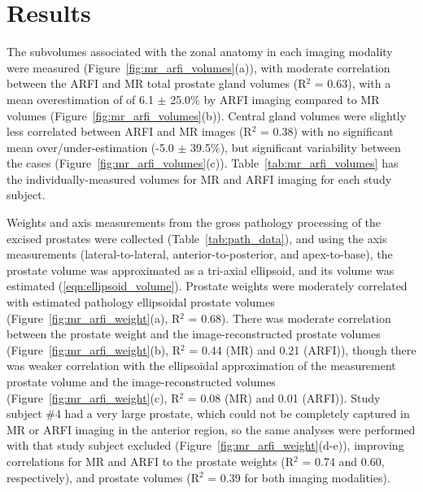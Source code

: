 \section{Results}\label{sect:results}
The subvolumes associated with the zonal anatomy in each imaging modality were
measured (Figure~\ref{fig:mr_arfi_volumes}(a)), with moderate correlation
between the ARFI and MR total prostate gland volumes (R$^2$ = 0.63), with a
mean overestimation of of 6.1 $\pm$ 25.0\% by ARFI imaging compared to MR
volumes (Figure~\ref{fig:mr_arfi_volumes}(b)).  Central gland volumes were
slightly less correlated between ARFI and MR images (R$^2$ = 0.38) with no
significant mean over/under-estimation (-5.0 $\pm$ 39.5\%), but significant
variability between the cases (Figure~\ref{fig:mr_arfi_volumes}(c)).
Table~\ref{tab:mr_arfi_volumes} has the individually-measured volumes for MR
and ARFI imaging for each study subject.



Weights and axis measurements from the gross pathology processing of the
excised prostates were collected (Table~\ref{tab:path_data}), and using the
axis measurements (lateral-to-lateral, anterior-to-posterior, and
apex-to-base), the prostate volume was approximated as a tri-axial ellipsoid,
and its volume was estimated (\ref{eqn:ellipsoid_volume}).  Prostate weights
were moderately correlated with estimated pathology ellipsoidal prostate
volumes (Figure~\ref{fig:mr_arfi_weight}(a), R$^2$ = 0.68).  There was moderate
correlation between the prostate weight and the image-reconstructed prostate
volumes (Figure~\ref{fig:mr_arfi_weight}(b), R$^2$ = 0.44 (MR) and 0.21
(ARFI)), though there was weaker correlation with the ellipsoidal approximation
of the measurement prostate volume and the image-reconstructed volumes
(Figure~\ref{fig:mr_arfi_weight}(c), R$^2$ = 0.08 (MR) and 0.01 (ARFI)).  Study
subject \#4 had a very large prostate, which could not be completely captured
in MR or ARFI imaging in the anterior region, so the same analyses were
performed with that study subject excluded
(Figure~\ref{fig:mr_arfi_weight}(d-e)), improving correlations for MR and ARFI
to the prostate weights (R$^2$ = 0.74 and 0.60, respectively), and prostate
volumes (R$^2$ = 0.39 for both imaging modalities).



